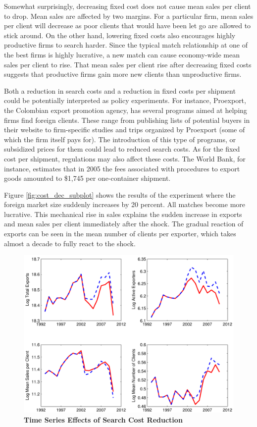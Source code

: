 Somewhat surprisingly, decreasing fixed cost does not cause mean sales per
client to drop. Mean sales are affected by two margins. For a particular
firm, mean sales per client will decrease as poor clients that would have
been let go are allowed to stick around. On the other hand, lowering fixed
costs also encourages highly productive firms to search harder. Since the
typical match relationship at one of the best firms is highly lucrative, a
new match can cause economy-wide mean sales per client to rise. That mean
sales per client rise after decreasing fixed costs suggests that productive
firms gain more new clients than unproductive firms.

Both a reduction in search costs and a reduction in fixed costs per shipment
could be potentially interpreted as policy experiments. For instance,
Proexport, the Colombian export promotion agency, has several programs aimed
at helping firms find foreign clients. These range from publishing lists of
potential buyers in their website to firm-specific studies and trips
organized by Proexport (some of which the firm itself pays for). The
introduction of this type of programs, or subsidized prices for them could
lead to reduced search costs. As for the fixed cost per shipment,
regulations may also affect these costs. The World Bank, for instance,
estimates that in 2005 the fees associated with procedures to export goods
amounted to \$1,745 per one-container shipment.

Figure \ref{fig:cost_dec_subplot} shows the results of the experiment where
the foreign market size suddenly increases by 20 percent. All matches become
more lucrative. This mechanical rise in sales explains the sudden increase
in exports and mean sales per client immediately after the shock. The
gradual reaction of exports can be seen in the mean number of clients per
exporter, which takes almost a decade to fully react to the shock.

\pagebreak

\begin{figure}[tbp]
\centering\includegraphics[width=\textwidth]{figures/figure3-eps-converted-to.pdf}
\caption{\textbf{Time Series Effects of Search Cost Reduction}}
\label{fig:search_dec_subplot}
\end{figure}
\newpage

